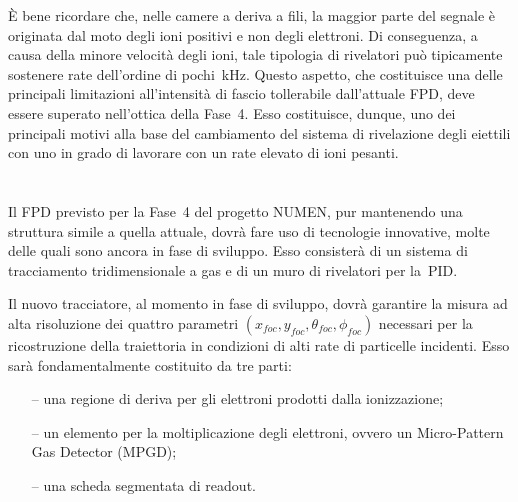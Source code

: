 È bene ricordare che, nelle camere a deriva a fili, la maggior parte del segnale è originata dal moto degli ioni positivi e non degli elettroni.
Di conseguenza, a causa della minore velocità degli ioni, tale tipologia di rivelatori può tipicamente sostenere rate dell'ordine di pochi~kHz. 
Questo aspetto, che costituisce una delle principali limitazioni all'intensità di fascio tollerabile dall'attuale FPD, deve essere superato nell'ottica della Fase~4. 
Esso costituisce, dunque, uno dei principali motivi alla base del cambiamento del sistema di rivelazione degli eiettili con uno in grado di lavorare con un rate elevato di ioni pesanti. 


\section{}




Il FPD previsto per la Fase~4 del progetto NUMEN, pur mantenendo una struttura simile a quella attuale, dovrà fare uso di tecnologie innovative, molte delle quali sono ancora in fase di sviluppo.
Esso consisterà di un sistema di tracciamento tridimensionale a gas e di un muro di rivelatori per la~PID.


Il nuovo tracciatore, al momento in fase di sviluppo, dovrà garantire la misura ad alta risoluzione dei quattro parametri $ \left(  x_{foc}, y_{foc}, \theta_{foc}, \phi_{foc}  \right)$ necessari per la ricostruzione della traiettoria in condizioni di alti rate di particelle incidenti. 
Esso sarà fondamentalmente costituito da tre parti:
\begin{itemize}
	\item[--] una regione di deriva per gli elettroni prodotti dalla ionizzazione;
	\item[--] un elemento per la moltiplicazione degli elettroni, ovvero un Micro-Pattern Gas Detector (MPGD);
	\item[--] una scheda segmentata di readout.
\end{itemize}

